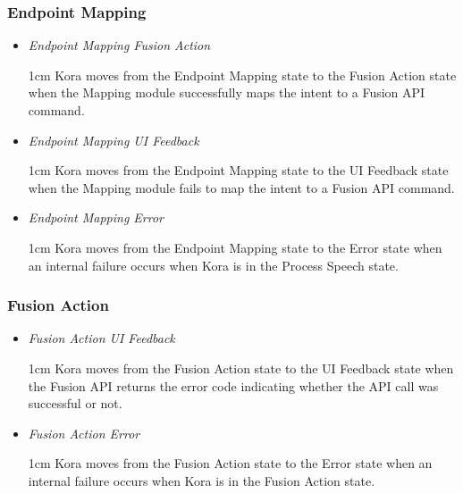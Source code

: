 \documentclass[onecolumn, draftclsnofoot,10pt, compsoc]{IEEEtran}
\def \botname{Kora\xspace}
\newenvironment{indentItem}[1][1cm]{\begin{adjustwidth}{#1}{}}{\end{adjustwidth}}
\begin{document}
		\subsubsection{Endpoint Mapping}
		\begin{itemize}
			\item \textit{Endpoint Mapping \textrightarrow{} Fusion Action}
			\begin{indentItem}
				\botname moves from the Endpoint Mapping state to the Fusion Action state when the Mapping module successfully maps the intent to a Fusion API command.
			\end{indentItem}
			\item \textit{Endpoint Mapping \textrightarrow{} UI Feedback}
			\begin{indentItem}
				\botname moves from the Endpoint Mapping state to the UI Feedback state when the Mapping module fails to map the intent to a Fusion API command.
			\end{indentItem}
			\item \textit{Endpoint Mapping \textrightarrow{} Error}
			\begin{indentItem}
				\botname moves from the Endpoint Mapping state to the Error state when an internal failure occurs when \botname is in the Process Speech state.
			\end{indentItem}
		\end{itemize}
		
		\subsubsection{Fusion Action}
		\begin{itemize}
			\item \textit{Fusion Action \textrightarrow{} UI Feedback}
			\begin{indentItem}
				\botname moves from the Fusion Action state to the UI Feedback state when the Fusion API returns the error code indicating whether the API call was successful or not.
			\end{indentItem}
			\item \textit{Fusion Action \textrightarrow{} Error}
			\begin{indentItem}
				\botname moves from the Fusion Action state to the Error state when an internal failure occurs when \botname is in the Fusion Action state.
			\end{indentItem}
		\end{itemize}
		
\end{document}
